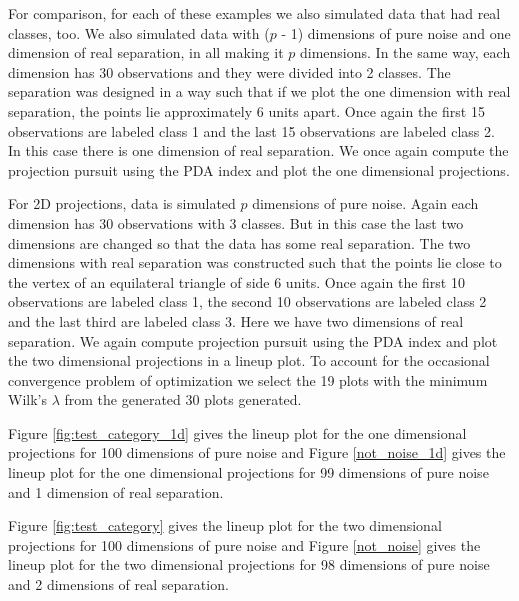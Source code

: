 \documentclass[12]{article}
\begin{document}
For comparison, for each of these examples we also simulated data that had real classes, too. We also simulated data with ($p$ - 1) dimensions of pure noise and one dimension of real separation, in all making it $p$ dimensions. In the same way, each dimension has  30 observations and they were divided into 2 classes. The separation was designed in a way such that if we plot the one dimension with real separation, the points lie approximately 6 units apart. Once again the first 15 observations are labeled class 1 and the last 15 observations are labeled class 2. In this case there is one dimension of real separation. We once again compute the projection pursuit using the PDA index and plot the one dimensional projections.

For 2D projections, data is simulated $p$ dimensions of pure noise. Again each dimension has  30 observations with 3 classes. But in this case the last two dimensions are changed so that the data has some real separation. The two dimensions with real separation was constructed such that the points lie close to the vertex of an equilateral triangle of side 6 units. Once again the first 10 observations are labeled class 1, the second 10 observations are labeled class 2 and the last third are labeled class 3. Here we have two dimensions of real separation. We again compute projection pursuit using the PDA index and plot the two dimensional projections in a lineup plot.  To account for the occasional convergence problem of optimization we select the 19 plots with the minimum Wilk's $\lambda$ from the generated 30 plots generated.

Figure \ref{fig:test_category_1d} gives the lineup plot for the one dimensional projections for 100 dimensions of pure noise and Figure \ref{not_noise_1d} gives the lineup plot for the one dimensional projections for 99 dimensions of pure noise and 1 dimension of real separation.

Figure \ref{fig:test_category} gives the lineup plot for the two dimensional projections for 100 dimensions of pure noise and Figure \ref{not_noise} gives the lineup plot for the two dimensional projections for 98 dimensions of pure noise and 2 dimensions of real separation.
\end{document}
